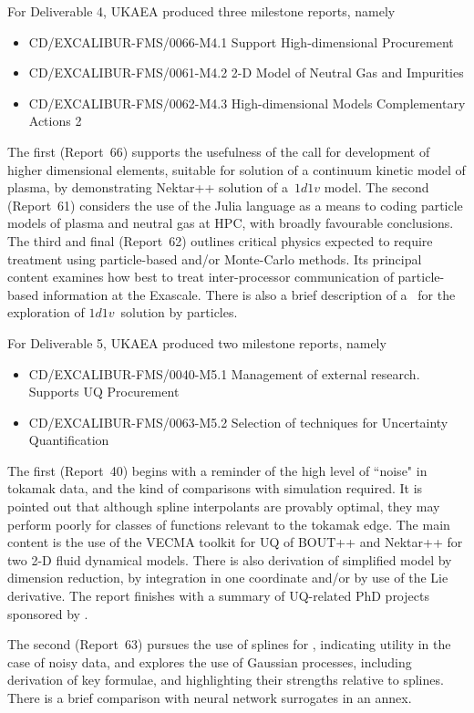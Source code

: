 
For Deliverable 4, UKAEA produced three milestone reports, namely 
\begin{itemize}
\item CD/EXCALIBUR-FMS/0066-M4.1   Support High-dimensional Procurement
\item CD/EXCALIBUR-FMS/0061-M4.2   2-D Model of Neutral Gas and Impurities 
\item CD/EXCALIBUR-FMS/0062-M4.3   High-dimensional Models Complementary Actions 2 
\end{itemize}
The first (Report~66)  supports the usefulness of the call for development
of higher dimensional elements, suitable for solution of a continuum
kinetic model of plasma, by demonstrating Nektar++ solution of a~$1d1v$
model. The second (Report~61)  considers the use of the Julia language as
a means to coding  particle models of plasma and neutral gas at HPC,
with broadly favourable conclusions. The third and final (Report~62) 
outlines critical physics expected to require treatment using
particle-based and/or Monte-Carlo methods.  Its principal content
examines how best to treat inter-processor communication of
particle-based information at the Exascale.
There is also a brief description of a \papp \ for the exploration
of $1d1v$~solution by particles.

For Deliverable 5, UKAEA produced two milestone reports, namely 
\begin{itemize}
\item CD/EXCALIBUR-FMS/0040-M5.1   Management of external research. Supports UQ Procurement 
\item CD/EXCALIBUR-FMS/0063-M5.2   Selection of techniques for Uncertainty Quantification 
\end{itemize}
The first (Report~40)  begins with a reminder of the high
level of ``noise" in tokamak data, and the kind of comparisons
with simulation required.  It is pointed out that although
spline interpolants are provably optimal, they may perform
poorly for classes of functions relevant to the tokamak edge.
The main content is the use of the VECMA toolkit for UQ of
BOUT++ and Nektar++ for two 2-D fluid dynamical models.
There is also derivation of simplified model by dimension
reduction, by integration in one coordinate and/or
by use of the Lie derivative.
The report finishes with a summary of
UQ-related PhD projects sponsored by \nep.

The second (Report~63)  pursues
the use of splines for \nep, indicating utility in the case of noisy data,
and explores the use of Gaussian processes, including derivation
of key formulae, and highlighting their strengths relative to splines.
There is a brief comparison with neural network surrogates in an annex.

